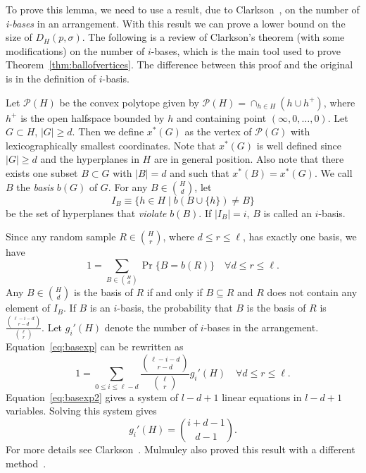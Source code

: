 \documentclass [letterpaper] {article}
\begin{document}
To prove this lemma, we need to use a result, due to Clarkson~\cite{Clarkson93}, on the number of \emph{i-bases} in an arrangement. With this result we can prove a lower bound on the size of $D_{H}(p,\sigma)$. The following is a review of Clarkson's theorem (with some modifications) on the number of $i$-bases, which is the main tool used to prove Theorem~\ref{thm:ballofvertices}. The difference between this proof and the original is in the definition of $i$-basis.

Let $\mathcal{P}(H)$ be the convex polytope given by $\mathcal{P}(H) = \cap_{h \in H}(h \cup h^{+})$, where $h^{+}$ is the open halfspace bounded by $h$ and containing point $(\infty, 0, \ldots, 0)$. Let $G \subset H$, $|G| \geq d$. Then we define $x^{*}(G)$ as the vertex of $\mathcal{P}(G)$ with lexicographically smallest coordinates. Note that $x^{*}(G)$ is well defined since $|G| \geq d$ and the hyperplanes in $H$ are in general position. Also note that there exists one subset $B \subset G$ with $|B| = d$ and such that $x^{*}(B) = x^{*}(G)$. We call $B$ the \emph{basis} $b(G)$ of $G$. For any $B \in \binom{H}{d}$, let
 \[I_{B} \equiv \{h \in H \mid b(B \cup \{h\}) \neq B\} \]
be the set of hyperplanes that \emph{violate} $b(B)$. If $|I_{B}| = i$, $B$ is called an $i$-basis.

Since any random sample $R \in \binom{H}{r}$, where $d \leq r \leq \ell$, has exactly one basis, we have
\begin{equation}
  \label{eq:basexp}
  1 = \sum_{B \in \binom{H}{d}} \Pr\{ B = b(R)\} \quad \forall d \leq r \leq \ell .
\end{equation}
 Any $B \in \binom{H}{d}$ is the basis of $R$ if and only if $B \subseteq R$ and $R$ does not contain any element of $I_{B}$. If $B$ is an $i$-basis, the probability that $B$ is the basis of $R$ is $\frac{\binom{\ell-i-d}{r-d}}{\binom{\ell}{r}}$. Let $g_{i}'(H)$ denote the number of $i$-bases in the arrangement. Equation~\eqref{eq:basexp} can be rewritten as
 \begin{equation}
   \label{eq:basexp2}
   1 = \sum_{0 \leq i \leq \ell-d}\frac{\binom{\ell-i-d}{r-d}}{\binom{\ell}{r}}g_{i}'(H) \quad \forall d \leq r \leq \ell .
 \end{equation}
Equation~\eqref{eq:basexp2} gives a system of $l - d + 1$ linear equations in $l - d + 1$ variables. Solving this system gives
\begin{equation}
  \label{eq:numibasis}
  g_{i}'(H) = \binom{i+d-1}{d-1}.
\end{equation}
For more details see Clarkson~\cite{Clarkson93}. Mulmuley also proved this result with a different method~\cite{Mulmuley93}.
\end{document}
